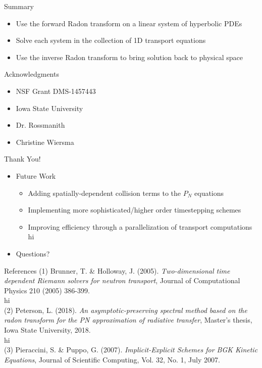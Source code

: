 \documentclass{beamer}
\begin{document}
\begin{frame}{Summary}
    \begin{itemize}
        \item
            Use the forward Radon transform on a linear system of hyperbolic PDEs
        \item
            Solve each system in the collection of 1D transport equations
        \item
            Use the inverse Radon transform to bring solution back to physical space
  \end{itemize}
\end{frame}

\begin{frame}{Acknowledgments}
\begin{itemize}
    \item
        NSF Grant DMS-1457443
    \item
        Iowa State University
    \item
        Dr. Rossmanith
    \item
        Christine Wiersma
\end{itemize}
\end{frame}

\begin{frame}{Thank You!}
    \begin{itemize}
        \item
            Future Work
        \begin{itemize}
            \item
                Adding spatially-dependent collision terms to the $P_N$ equations
            \item 
                Implementing more sophisticated/higher order timestepping schemes
            \item
                Improving efficiency through a parallelization of transport computations
            \\ \color{white} hi \color{black} \\ %
        \end{itemize}
        \pause
        \item
            Questions?
    \end{itemize}
\end{frame}

\begin{frame}{References}
    (1) Brunner, T. \& Holloway, J. (2005). \textit{Two-dimensional time dependent Riemann solvers for neutron transport}, Journal of Computational Physics 210 (2005) 386-399. 
        \\ \color{white} hi \color{black} \\
    (2) Peterson, L. (2018). \textit{An asymptotic-preserving spectral method based on the radon transform for the PN approximation of radiative transfer}, Master's thesis, Iowa State University, 2018. 
        \\ \color{white} hi \color{black} \\
    (3) Pieraccini, S. \& Puppo, G. (2007). \textit{Implicit-Explicit Schemes for BGK Kinetic Equations}, Journal of Scientific Computing, Vol. 32, No. 1, July 2007.
\end{frame}
\end{document}
